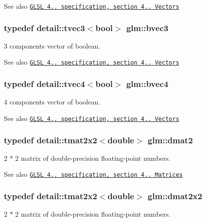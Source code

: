 \begin{DoxySeeAlso}{\-See also}
\href{http://www.opengl.org/registry/doc/GLSLangSpec.4.20.8.pdf}{\tt \-G\-L\-S\-L 4.. specification, section 4.. \-Vectors} 
\end{DoxySeeAlso}
\hypertarget{group__core__types_gac192f5fbd7fcb78ca703d4684f323512}{
\subsubsection[{bvec3}]{\setlength{\rightskip}{0pt plus 5cm}typedef detail\-::tvec3$<$bool$>$ {\bf glm\-::bvec3}}}\label{group__core__types_gac192f5fbd7fcb78ca703d4684f323512}
3 components vector of boolean.

\begin{DoxySeeAlso}{\-See also}
\href{http://www.opengl.org/registry/doc/GLSLangSpec.4.20.8.pdf}{\tt \-G\-L\-S\-L 4.. specification, section 4.. \-Vectors} 
\end{DoxySeeAlso}
\hypertarget{group__core__types_ga8ec34c649bc4513202aff479486bbcea}{
\subsubsection[{bvec4}]{\setlength{\rightskip}{0pt plus 5cm}typedef detail\-::tvec4$<$bool$>$ {\bf glm\-::bvec4}}}\label{group__core__types_ga8ec34c649bc4513202aff479486bbcea}
4 components vector of boolean.

\begin{DoxySeeAlso}{\-See also}
\href{http://www.opengl.org/registry/doc/GLSLangSpec.4.20.8.pdf}{\tt \-G\-L\-S\-L 4.. specification, section 4.. \-Vectors} 
\end{DoxySeeAlso}
\hypertarget{group__core__types_gaa53909085d199392937e3933af5410a1}{
\subsubsection[{dmat2}]{\setlength{\rightskip}{0pt plus 5cm}typedef detail\-::tmat2x2$<$double$>$ {\bf glm\-::dmat2}}}\label{group__core__types_gaa53909085d199392937e3933af5410a1}
2 $\ast$ 2 matrix of double-\/precision floating-\/point numbers.

\begin{DoxySeeAlso}{\-See also}
\href{http://www.opengl.org/registry/doc/GLSLangSpec.4.20.8.pdf}{\tt \-G\-L\-S\-L 4.. specification, section 4.. \-Matrices} 
\end{DoxySeeAlso}
\hypertarget{group__core__types_ga2c1de969d1d8cfcb297dbfa476b33dc8}{
\subsubsection[{dmat2x2}]{\setlength{\rightskip}{0pt plus 5cm}typedef detail\-::tmat2x2$<$double$>$ {\bf glm\-::dmat2x2}}}\label{group__core__types_ga2c1de969d1d8cfcb297dbfa476b33dc8}
2 $\ast$ 2 matrix of double-\/precision floating-\/point numbers.

